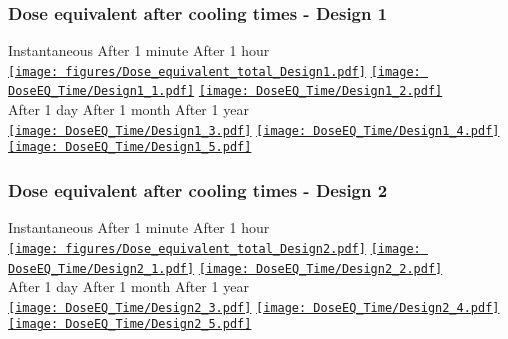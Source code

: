 \documentclass[xcolor={dvipsnames}]{beamer}
\begin{document}
\begin{frame}
  \frametitle{Dose equivalent after cooling times - \textbf{Design 1}}
  \hypertarget{coolingtimesprev_Design1}{}
  \begin{center}
    \hspace*{1cm} Instantaneous \hfill After 1 minute \hfill After 1 hour \hspace*{1.2cm} \\
  \hyperlink{Dose_equivalent_Design1}{\texttt{[image: figures/Dose\_equivalent\_total\_Design1.pdf]}}
  \hyperlink{Dose_equivalent_minute_Design1}{\texttt{[image: DoseEQ\_Time/Design1\_1.pdf]}}
  \hyperlink{Dose_equivalent_hour_Design1}{\texttt{[image: DoseEQ\_Time/Design1\_2.pdf]}}\\
    \hspace*{1.2cm} After 1 day \hfill After 1 month \hfill After 1 year\hspace*{1.4cm} \\
  \hyperlink{Dose_equivalent_day_Design1}{\texttt{[image: DoseEQ\_Time/Design1\_3.pdf]}}
  \hyperlink{Dose_equivalent_month_Design1}{\texttt{[image: DoseEQ\_Time/Design1\_4.pdf]}}
  \hyperlink{Dose_equivalent_year_Design1}{\texttt{[image: DoseEQ\_Time/Design1\_5.pdf]}}
 \end{center}
\end{frame}
\begin{frame}
  \frametitle{Dose equivalent after cooling times - \textbf{Design 2}}
  \hypertarget{coolingtimesprev_Design2}{}
  \begin{center}
    \hspace*{1cm} Instantaneous \hfill After 1 minute \hfill After 1 hour \hspace*{1.2cm} \\
  \hyperlink{Dose_equivalent_Design2}{\texttt{[image: figures/Dose\_equivalent\_total\_Design2.pdf]}}
  \hyperlink{Dose_equivalent_minute_Design2}{\texttt{[image: DoseEQ\_Time/Design2\_1.pdf]}}
  \hyperlink{Dose_equivalent_hour_Design2}{\texttt{[image: DoseEQ\_Time/Design2\_2.pdf]}}\\
    \hspace*{1.2cm} After 1 day \hfill After 1 month \hfill After 1 year\hspace*{1.4cm} \\
  \hyperlink{Dose_equivalent_day_Design2}{\texttt{[image: DoseEQ\_Time/Design2\_3.pdf]}}
  \hyperlink{Dose_equivalent_month_Design2}{\texttt{[image: DoseEQ\_Time/Design2\_4.pdf]}}
  \hyperlink{Dose_equivalent_year_Design2}{\texttt{[image: DoseEQ\_Time/Design2\_5.pdf]}}
 \end{center}
\end{frame}
\end{document}
